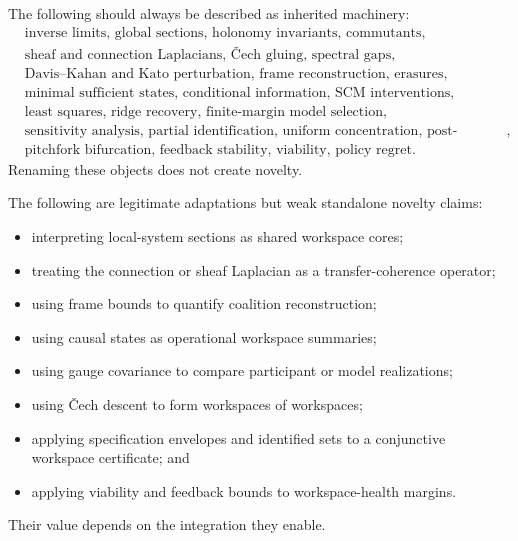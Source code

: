 
The following should always be described as inherited machinery:
\[
\begin{aligned}
&\text{inverse limits, global sections, holonomy invariants, commutants},\\
&\text{sheaf and connection Laplacians, \v{C}ech gluing, spectral gaps},\\
&\text{Davis--Kahan and Kato perturbation, frame reconstruction, erasures},\\
&\text{minimal sufficient states, conditional information, SCM interventions},\\
&\text{least squares, ridge recovery, finite-margin model selection},\\
&\text{sensitivity analysis, partial identification, uniform concentration, post-selection inference},\\
&\text{pitchfork bifurcation, feedback stability, viability, policy regret}.
\end{aligned}
\]
Renaming these objects does not create novelty.


The following are legitimate adaptations but weak standalone novelty claims:
\begin{itemize}
\item interpreting local-system sections as shared workspace cores;
\item treating the connection or sheaf Laplacian as a transfer-coherence
 operator;
\item using frame bounds to quantify coalition reconstruction;
\item using causal states as operational workspace summaries;
\item using gauge covariance to compare participant or model realizations;
\item using \v{C}ech descent to form workspaces of workspaces;
\item applying specification envelopes and identified sets to a conjunctive
 workspace certificate; and
\item applying viability and feedback bounds to workspace-health margins.
\end{itemize}
Their value depends on the integration they enable.


